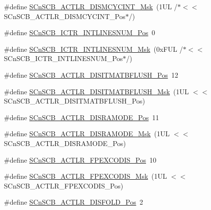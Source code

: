 \begin{DoxyCompactItemize}
\item 
\#define \hyperlink{group___c_m_s_i_s___s_cn_s_c_b_ga2a2818f0489ad10b6ea2964e899d4cbc}{S\+Cn\+S\+C\+B\+\_\+\+A\+C\+T\+L\+R\+\_\+\+D\+I\+S\+M\+C\+Y\+C\+I\+N\+T\+\_\+\+Msk}~(1\+U\+L /$\ast$$<$$<$ S\+Cn\+S\+C\+B\+\_\+\+A\+C\+T\+L\+R\+\_\+\+D\+I\+S\+M\+C\+Y\+C\+I\+N\+T\+\_\+\+Pos$\ast$/)
\item 
\#define \hyperlink{group___c_m_s_i_s___s_cn_s_c_b_ga0777ddf379af50f9ca41d40573bfffc5}{S\+Cn\+S\+C\+B\+\_\+\+I\+C\+T\+R\+\_\+\+I\+N\+T\+L\+I\+N\+E\+S\+N\+U\+M\+\_\+\+Pos}~0
\item 
\#define \hyperlink{group___c_m_s_i_s___s_cn_s_c_b_ga3efa0f5210051464e1034b19fc7b33c7}{S\+Cn\+S\+C\+B\+\_\+\+I\+C\+T\+R\+\_\+\+I\+N\+T\+L\+I\+N\+E\+S\+N\+U\+M\+\_\+\+Msk}~(0x\+F\+U\+L /$\ast$$<$$<$ S\+Cn\+S\+C\+B\+\_\+\+I\+C\+T\+R\+\_\+\+I\+N\+T\+L\+I\+N\+E\+S\+N\+U\+M\+\_\+\+Pos$\ast$/)
\item 
\#define \hyperlink{group___c_m_s_i_s___s_cn_s_c_b_ga5f888e0ebc18cc2d99976405777c142f}{S\+Cn\+S\+C\+B\+\_\+\+A\+C\+T\+L\+R\+\_\+\+D\+I\+S\+I\+T\+M\+A\+T\+B\+F\+L\+U\+S\+H\+\_\+\+Pos}~12
\item 
\#define \hyperlink{group___c_m_s_i_s___s_cn_s_c_b_ga46b16a03b408184720134ef42203ac2e}{S\+Cn\+S\+C\+B\+\_\+\+A\+C\+T\+L\+R\+\_\+\+D\+I\+S\+I\+T\+M\+A\+T\+B\+F\+L\+U\+S\+H\+\_\+\+Msk}~(1\+U\+L $<$$<$ S\+Cn\+S\+C\+B\+\_\+\+A\+C\+T\+L\+R\+\_\+\+D\+I\+S\+I\+T\+M\+A\+T\+B\+F\+L\+U\+S\+H\+\_\+\+Pos)
\item 
\#define \hyperlink{group___c_m_s_i_s___s_cn_s_c_b_ga1bffb5e05053d15cbe42fbe87d225dcb}{S\+Cn\+S\+C\+B\+\_\+\+A\+C\+T\+L\+R\+\_\+\+D\+I\+S\+R\+A\+M\+O\+D\+E\+\_\+\+Pos}~11
\item 
\#define \hyperlink{group___c_m_s_i_s___s_cn_s_c_b_ga436fc1bd011b15c9585bb3ace5332ce3}{S\+Cn\+S\+C\+B\+\_\+\+A\+C\+T\+L\+R\+\_\+\+D\+I\+S\+R\+A\+M\+O\+D\+E\+\_\+\+Msk}~(1\+U\+L $<$$<$ S\+Cn\+S\+C\+B\+\_\+\+A\+C\+T\+L\+R\+\_\+\+D\+I\+S\+R\+A\+M\+O\+D\+E\+\_\+\+Pos)
\item 
\#define \hyperlink{group___c_m_s_i_s___s_cn_s_c_b_gaa743743f5af93d6ece74a426b355ab70}{S\+Cn\+S\+C\+B\+\_\+\+A\+C\+T\+L\+R\+\_\+\+F\+P\+E\+X\+C\+O\+D\+I\+S\+\_\+\+Pos}~10
\item 
\#define \hyperlink{group___c_m_s_i_s___s_cn_s_c_b_gadd12baaeeea3220b03867e4b8a1432aa}{S\+Cn\+S\+C\+B\+\_\+\+A\+C\+T\+L\+R\+\_\+\+F\+P\+E\+X\+C\+O\+D\+I\+S\+\_\+\+Msk}~(1\+U\+L $<$$<$ S\+Cn\+S\+C\+B\+\_\+\+A\+C\+T\+L\+R\+\_\+\+F\+P\+E\+X\+C\+O\+D\+I\+S\+\_\+\+Pos)
\item 
\#define \hyperlink{group___c_m_s_i_s___s_cn_s_c_b_gaab395870643a0bee78906bb15ca5bd02}{S\+Cn\+S\+C\+B\+\_\+\+A\+C\+T\+L\+R\+\_\+\+D\+I\+S\+F\+O\+L\+D\+\_\+\+Pos}~2
$$
\end{DoxyCompactItemize}
